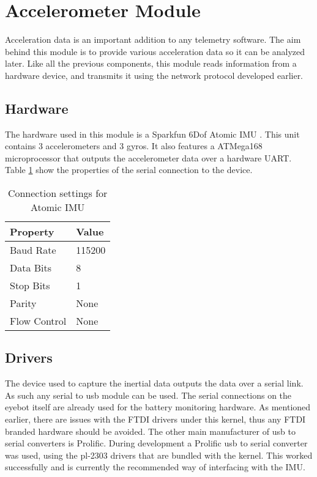 

\section{Accelerometer  Module}
\label{sec:imu}

Acceleration data is an important addition to any telemetry software. The aim behind this module is to provide various acceleration data so it can be analyzed later. Like all the previous components, this module reads information from a hardware device, and transmits it using the network protocol developed earlier.

\subsection{Hardware}

The hardware used in this module is a Sparkfun 6Dof Atomic IMU \cite{6dofimu}. This unit contains 3 accelerometers and 3 gyros. It also features a ATMega168 microprocessor that outputs the accelerometer data over a hardware UART. Table \ref{tab:atomicimusettings} show the properties of the serial connection to the device.

\begin{table}
\begin{center}
    \begin{tabular}{|l|l|}
        \hline
        Property & Value \\ \hline
        Baud Rate    & 115200 \\
        Data Bits    & 8    \\ 
        Stop Bits    & 1    \\ 
        Parity       & None \\ 
        Flow Control & None \\
        \hline
    \end{tabular}
	\caption{Connection settings for Atomic IMU}
	\label{tab:atomicimusettings}
\end{center}
\end{table}

\subsection{ Drivers}

The device used to capture the inertial data outputs the data over a serial link. As such any serial to usb module can be used. The serial connections on the eyebot itself are already used for the battery monitoring hardware. As mentioned earlier, there are issues with the FTDI drivers under this kernel, thus any FTDI branded hardware should be avoided. The other main manufacturer of usb to serial converters is Prolific. During development a Prolific usb to serial converter was used, using the pl-2303 drivers that are bundled with the kernel. This worked successfully and is currently the recommended way of interfacing with the IMU.

